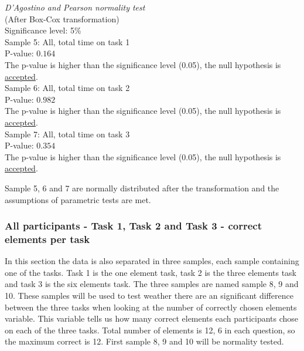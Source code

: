 \begin{center}
	\begin{tcolorbox}[box align=center,width=\textwidth-5cm]
		\centering
		\textit{D'Agostino and Pearson normality test}\\
		(After Box-Cox transformation)\\
		Significance level: 5\%  \\[0.5cm]
		
		Sample 5: All, total time on task 1 \\
		P-value: $0.164$\\
		The p-value is higher than the significance level (0.05), the null hypothesis is \underline{accepted}. \\[0.5cm]
		
		Sample 6: All, total time on task 2 \\
		P-value: $0.982$ \\
		The p-value is higher than the significance level (0.05), the null hypothesis is \underline{accepted}. \\[0.5cm]
		
		Sample 7: All, total time on task 3 \\
		P-value: $0.354$ \\
		The p-value is higher than the significance level (0.05), the null hypothesis is \underline{accepted}. \\[0.5cm]
	\end{tcolorbox} 
\end{center}

 Sample 5, 6 and 7 are normally distributed after the transformation and the assumptions of parametric tests are met. 
 
 \subsubsection[Sample 8, 9 and 10]{All participants - Task 1, Task 2 and Task 3 - correct elements per task}\label{sec:task123_correct}
 
 In this section the data is also separated in three samples, each sample containing one of the tasks. Task 1 is the one element task, task 2 is the three elements task and task 3 is the six elements task. The three samples are named sample 8, 9 and 10. These samples will be used to test weather there are an significant difference between the three tasks when looking at the number of correctly chosen elements variable. This variable tells us how many correct elements each participants chose on each of the three tasks. Total number of elements is 12, 6 in each question, so the maximum correct is 12.  First sample 8, 9 and 10 will be normality tested. 
 
